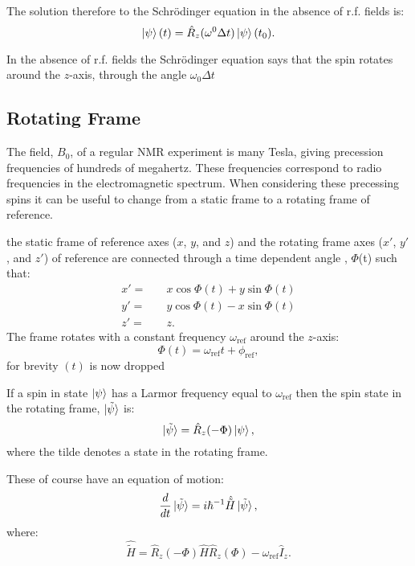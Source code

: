 The solution therefore to the Schr\"odinger equation in the absence of r.f. fields is:
\begin{equation}
  \ket{\psi}(t) = \hat{R}_z(\omega^0\Delta{t})\ket{\psi}(t_0).
\end{equation}

In the absence of r.f. fields the Schr\"odinger equation says that the spin rotates
around the $z$-axis, through the angle $\omega_0\Delta{t}$

\subsection{Rotating Frame}

The field, $B_0$, of a regular NMR experiment is many Tesla, giving precession
frequencies of hundreds of megahertz. These frequencies correspond to radio frequencies
in the electromagnetic spectrum. When considering these precessing spins
it can be useful to change from a static frame to a rotating frame of reference.

the static frame of reference axes ($x$, $y$, and $z$) and the rotating frame axes ($x'$, $y'$, and $z'$) of reference are connected through
a time dependent angle , $\Phi$(t) such that:
\begin{align}
  x' =&\quad x\cos\Phi(t) + y\sin\Phi(t)\\
  y' =&\quad y\cos\Phi(t) - x\sin\Phi(t)\\
  z' =&\quad z.
\end{align}
The frame rotates with a constant frequency $\omega_\text{ref}$ around the $z$-axis:
\begin{equation}
  \Phi(t) = \omega_{\text{ref}}t + \phi_{\text{ref}},
\end{equation}
for brevity $(t)$ is now dropped

If a spin in state $\ket{\psi}$ has a Larmor frequency equal to $\omega_\text{ref}$
then the spin state in the rotating frame, $\ket{\tilde{\psi}}$ is:
\begin{equation}
  \ket{\tilde{\psi}} = \hat{R}_z(-\Phi)\ket{\psi},
\end{equation}
where the tilde denotes a state in the rotating frame.

These of course have an equation of motion:
\begin{equation}
  \frac{d}{dt}\ket{\tilde{\psi}} = i\hbar^{-1}\hat{\tilde{H}}\ket{\tilde{\psi}},
\end{equation}
where:
\begin{equation}\label{eqn:RotFrame}
  \hat{\tilde{H}} = \hat{R}_z(-\Phi)\hat{H}\hat{R}_z(\Phi) - \omega_\text{ref}\hat{I}_z.
\end{equation}

